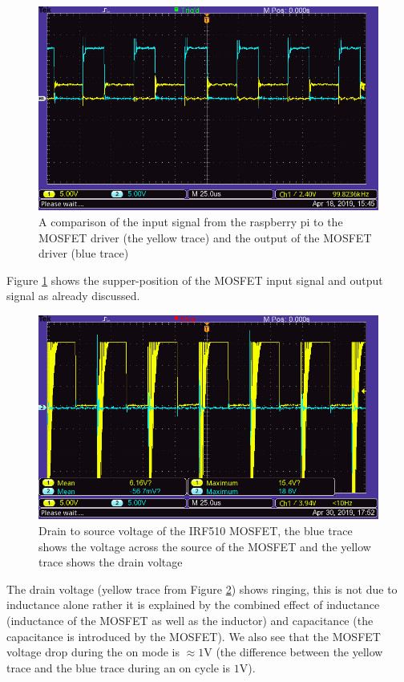\documentclass[a4paper, 12pt]{article}
\begin{document}
\begin{figure}[H]
  \centering
  \includegraphics[width=\textwidth]{images/pwm_input_output_comparison.png}
  \caption{A comparison of the input signal from the raspberry pi to the MOSFET driver (the yellow trace) and the output of the MOSFET driver (blue trace)}
  \label{fig:pwm_input_output_comparison}
\end{figure}

Figure \ref{fig:pwm_input_output_comparison} shows the supper-position of the
MOSFET input signal and output signal as already discussed.\\

\begin{figure}[H]
  \centering
  \includegraphics[width=\textwidth]{images/VDS.png}
  \caption{Drain to source voltage of the IRF510 MOSFET, the blue trace shows the voltage across the source of the MOSFET and the yellow trace shows the drain voltage}
  \label{fig:vds}
\end{figure} 

The drain voltage (yellow trace from Figure \ref{fig:vds}) shows ringing, this is not due to inductance alone rather it is explained by the combined effect of inductance (inductance of the MOSFET as well as the inductor) and capacitance (the capacitance is introduced by the MOSFET). We also see that the MOSFET voltage drop during the on mode is $\approx 1$V (the difference between the yellow trace and the blue trace during an on cycle is $1$V).
 
\end{document}
